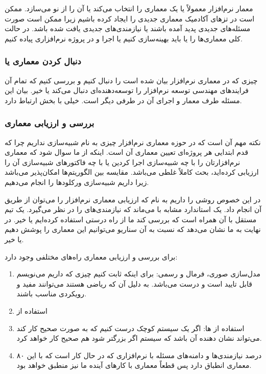 معمار نرم‌افزار معمولاً یا یک معماری را انتخاب می‌کند یا آن را از نو می‌سازد.
ممکن است در تز‌های آکادمیک معماری جدیدی را ایجاد کرده باشیم زیرا ممکن است صورت
مسئله‌های جدیدی پدید آمده باشند یا نیازمندی‌های  جدیدی یافت شده
باشد. در حالت کلی معماری‌ها را یا باید بهینه‌سازی کنیم یا اجرا و در پروژه
نرم‌افزاری پیاده کنیم.

\subsubsection{دنبال کردن معماری یا }

چیزی که در معماری نرم‌افزار بیان شده است را دنبال کنیم و بررسی کنیم که تمام آن
فرایند‌های مهندسی توسعه نرم‌افزار را توسعه‌دهنده‌ای دنبال می‌کند یا خیر. بیان
این مسئله طرف معمار و اجرای آن در طرفی دیگر است. خیلی با بخش  ارتباط دارد.

\subsubsection{بررسی و ارزیابی معماری}

نکته مهم آن است که در حوزه معماری نرم‌افزار چیزی به نام شبیه‌سازی نداریم چرا که
قدم ابتدایی هر پروژه‌ای تعیین معماری آن است. اینکه از ما سوال شود که معماری
نرم‌افزارتان را با چه شبیه‌سازی اجرا کردین یا با چه فاکتور‌های شبیه‌سازی آن را
ارزیابی کرده‌اید، بحث کاملاً غلطی می‌باشد. مقایسه بین الگوریتم‌ها امکان‌پذیر
می‌باشد زیرا داریم شبیه‌سازی ورکلود‌ها را انجام می‌دهیم.

در این خصوص روشی را داریم به نام  که ارزیابی معماری نرم‌افزار را
می‌توان از طریق آن انجام داد. یک استاندارد مشابه با  می‌ماند که
نیازمندی‌های  را در نظر می‌گیرد. یک تیم مستقل با آن همراه است
که بررسی کند ما از راه درستی استفاده کرده‌ایم یا خیر. در نهایت به ما نشان می‌دهد
که نسبت به آن سناریو می‌توانیم این معماری را پوشش دهیم یا خیر.

برای بررسی و ارزیابی معماری راه‌های مختلفی وجود دارد:

\begin{enumerate}
    \item مدل‌سازی صوری، فرمال و رسمی: برای اینکه ثابت کنیم چیزی که داریم
    می‌نویسم قابل تایید است و درست می‌باشد. به دلیل آن که ریاضی هستند می‌توانند
    مفید و رویکردی مناسب باشند.
    \item استفاده از 
    \item استفاده از ها: اگر یک سیستم کوچک درست کنیم که به
    صورت صحیح کار کند می‌تواند نشان دهنده آن باشد که سیستم اگر بزرگتر شود هم
    صحیح کار خواهد کرد.
    \item ۸۰ درصد نیازمندی‌ها و دامنه‌های مسئله با نرم‌افزاری که در حال کار است
    که با این معماری انطباق دارد پس قطعاً معماری با کار‌های آینده ما نیز منطبق
    خواهد بود.
\end{enumerate}

